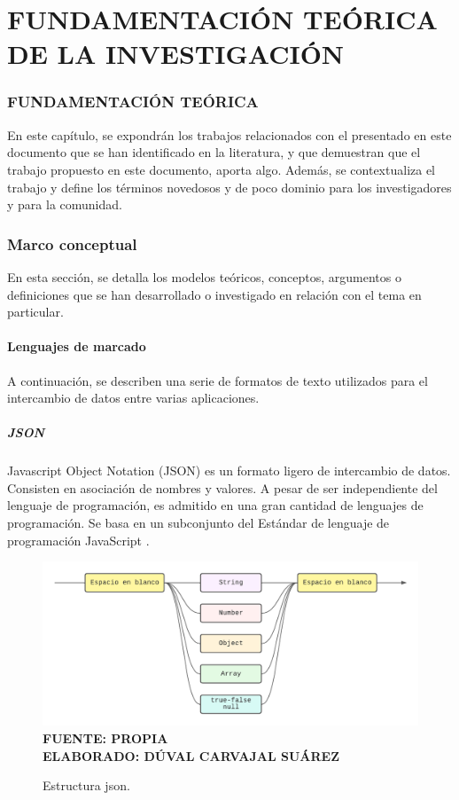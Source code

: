 \setcounter{chapter}{2}
\setcounter{section}{0}
\part{FUNDAMENTACIÓN TEÓRICA DE LA INVESTIGACIÓN}

\section*{FUNDAMENTACIÓN TEÓRICA}
En este capítulo, se expondrán los trabajos relacionados con el presentado en este documento que se han identificado en la literatura, y que demuestran que el trabajo propuesto en este documento, aporta algo. Además, se contextualiza el trabajo y define los términos novedosos y de poco dominio para los investigadores y para la comunidad.

\section{Marco conceptual}

En esta sección, se detalla los modelos teóricos, conceptos, argumentos o definiciones que se han desarrollado o investigado en relación con el tema en particular.


\subsection{Lenguajes de marcado}	

A continuación, se describen una serie de formatos de texto utilizados para el intercambio de datos entre varias aplicaciones.

\subsubsection{JSON}

Javascript Object Notation (JSON) es un formato ligero de intercambio de datos. Consisten en asociación de nombres y valores. A pesar de ser independiente del lenguaje de programación, es admitido en una gran cantidad de lenguajes de programación. Se basa en un subconjunto del Estándar de lenguaje de programación JavaScript \cite{JSON}.

\begin{figure}[h!]
	\caption{Estructura json.}
	\includegraphics[width=12cm]{img/json.png}
	\label{fig:json}
	\textbf{\\ FUENTE: PROPIA \\ ELABORADO: DÚVAL CARVAJAL SUÁREZ} 
\end{figure}

